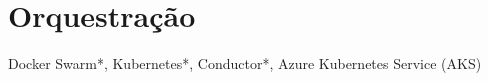 




\section{Orquestração}

Docker Swarm*, Kubernetes*, Conductor*, Azure Kubernetes Service (AKS)




